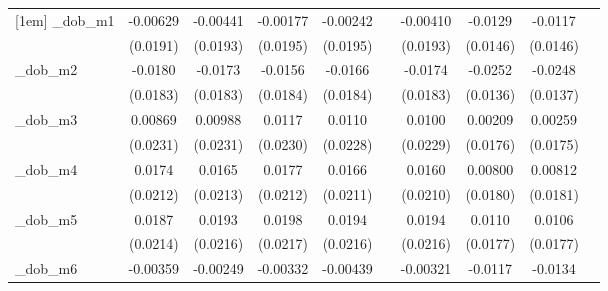 \begin{table}[htbp]
\begin{tabular}{l*{9}{c}}
[1em]
\_dob\_m1     &    -0.00629         &    -0.00441         &    -0.00177         &    -0.00242         &                     &    -0.00410         &     -0.0129         &     -0.0117         &                     \\
            &    (0.0191)         &    (0.0193)         &    (0.0195)         &    (0.0195)         &                     &    (0.0193)         &    (0.0146)         &    (0.0146)         &                     \\
[1em]
\_dob\_m2     &     -0.0180         &     -0.0173         &     -0.0156         &     -0.0166         &                     &     -0.0174         &     -0.0252\sym{*}  &     -0.0248\sym{*}  &                     \\
            &    (0.0183)         &    (0.0183)         &    (0.0184)         &    (0.0184)         &                     &    (0.0183)         &    (0.0136)         &    (0.0137)         &                     \\
[1em]
\_dob\_m3     &     0.00869         &     0.00988         &      0.0117         &      0.0110         &                     &      0.0100         &     0.00209         &     0.00259         &                     \\
            &    (0.0231)         &    (0.0231)         &    (0.0230)         &    (0.0228)         &                     &    (0.0229)         &    (0.0176)         &    (0.0175)         &                     \\
[1em]
\_dob\_m4     &      0.0174         &      0.0165         &      0.0177         &      0.0166         &                     &      0.0160         &     0.00800         &     0.00812         &                     \\
            &    (0.0212)         &    (0.0213)         &    (0.0212)         &    (0.0211)         &                     &    (0.0210)         &    (0.0180)         &    (0.0181)         &                     \\
[1em]
\_dob\_m5     &      0.0187         &      0.0193         &      0.0198         &      0.0194         &                     &      0.0194         &      0.0110         &      0.0106         &                     \\
            &    (0.0214)         &    (0.0216)         &    (0.0217)         &    (0.0216)         &                     &    (0.0216)         &    (0.0177)         &    (0.0177)         &                     \\
[1em]
\_dob\_m6     &    -0.00359         &    -0.00249         &    -0.00332         &    -0.00439         &                     &    -0.00321         &     -0.0117         &     -0.0134         &                     \\

\end{tabular}
\end{table}
